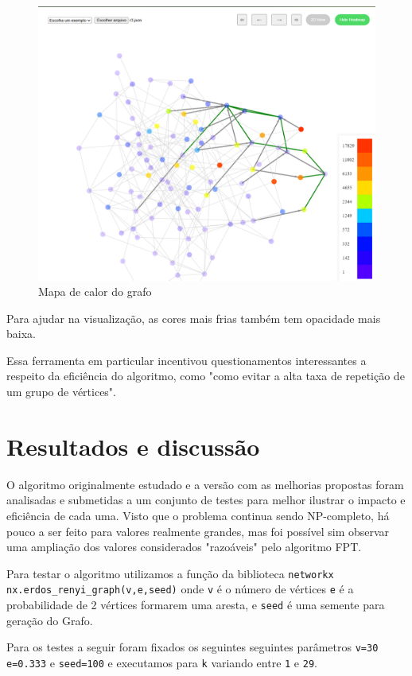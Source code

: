 \begin{figure}[!htb]
\centering
\includegraphics[width=12cm]{GrafoHeatmap.png}
\caption{Mapa de calor do grafo}
\label{fig:grafo-heatmap}
\end{figure}

Para ajudar na visualização, as cores mais frias também tem opacidade mais baixa.

Essa ferramenta em particular incentivou questionamentos interessantes a respeito da eficiência do algoritmo, como "como evitar a alta taxa de repetição de um grupo de vértices".

\chapter{Resultados e discussão}
O algoritmo originalmente estudado e a versão com as melhorias propostas foram analisadas e submetidas a um conjunto de testes para melhor ilustrar o impacto e eficiência de cada uma. Visto que o problema continua sendo NP-completo, há pouco a ser feito para valores realmente grandes, mas foi possível sim observar uma ampliação dos valores considerados "razoáveis" pelo algoritmo FPT.

Para testar o algoritmo utilizamos a função da biblioteca \texttt{networkx nx.erdos\_renyi\_graph(v,e,seed)} onde \texttt{v} é o número de vértices \texttt{e} é a probabilidade de 2 vértices formarem uma aresta, e \texttt{seed} é uma semente para geração do Grafo.

Para os testes a seguir foram fixados os seguintes seguintes parâmetros \texttt{v=30} \texttt{e=0.333} e \texttt{seed=100} e executamos para \texttt{k} variando entre \texttt{1} e \texttt{29}.

